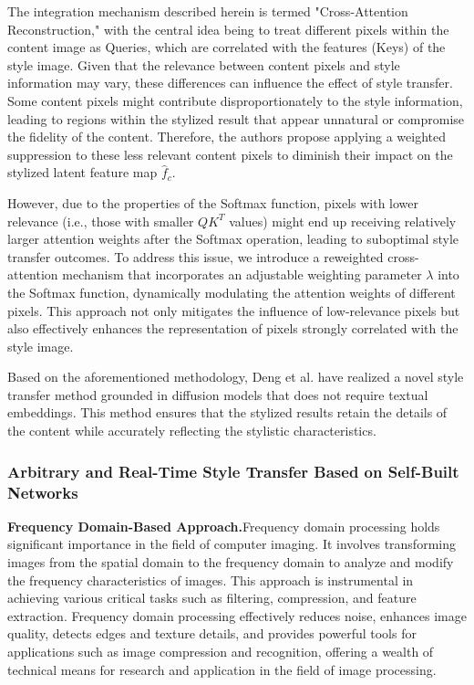 The integration mechanism described herein is termed "Cross-Attention Reconstruction," with the central idea being to treat different pixels within the content image as Queries, which are correlated with the features (Keys) of the style image. Given that the relevance between content pixels and style information may vary, these differences can influence the effect of style transfer. Some content pixels might contribute disproportionately to the style information, leading to regions within the stylized result that appear unnatural or compromise the fidelity of the content. Therefore, the authors propose applying a weighted suppression to these less relevant content pixels to diminish their impact on the stylized latent feature map $\hat f_c$.

However, due to the properties of the Softmax function, pixels with lower relevance (i.e., those with smaller  $QK^T$ values) might end up receiving relatively larger attention weights after the Softmax operation, leading to suboptimal style transfer outcomes. To address this issue, we introduce a reweighted cross-attention mechanism that incorporates an adjustable weighting parameter $\lambda$ into the Softmax function, dynamically modulating the attention weights of different pixels. This approach not only mitigates the influence of low-relevance pixels but also effectively enhances the representation of pixels strongly correlated with the style image.

Based on the aforementioned methodology, Deng et al. have realized a novel style transfer method grounded in diffusion models that does not require textual embeddings. This method ensures that the stylized results retain the details of the content while accurately reflecting the stylistic characteristics.

\subsubsection{Arbitrary and Real-Time Style Transfer Based on Self-Built Networks}

\textbf{Frequency Domain-Based Approach.}\quad Frequency domain processing holds significant importance in the field of computer imaging. It involves transforming images from the spatial domain to the frequency domain to analyze and modify the frequency characteristics of images. This approach is instrumental in achieving various critical tasks such as filtering, compression, and feature extraction. Frequency domain processing effectively reduces noise, enhances image quality, detects edges and texture details, and provides powerful tools for applications such as image compression and recognition, offering a wealth of technical means for research and application in the field of image processing.

